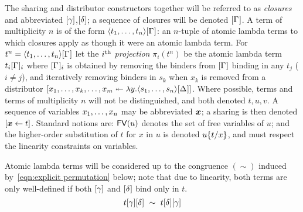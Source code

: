 \documentclass{llncs} %
\newif\ifnonotes\nonotesfalse
\newcommand{\EMPTY}[1]{\ifnonotes\else{\color{red}    \noindent #1}\fi}
\begin{document}
The sharing and distributor constructors together will be referred to as \emph{closures} and abbreviated $\g$,$\g*$;
%
a sequence of closures will be denoted $\G$.
%
A term of multiplicity $n$ is of the form $\tup t\G$: an $n$-tuple of atomic lambda terms to which closures apply as though it were an atomic lambda term.
%
%
For $t^n=\tup t\G$ let the \emph{$i^{\mbox{\scriptsize th}}$ projection} $\pi_i(t^n)$ be the atomic lambda term $t_i\G_i$ where $\G_i$ is obtained by removing the binders from $\G$ binding in any $t_j$ ($i\neq j$), and iteratively removing binders in $s_k$ when $x_k$ is removed from a distributor $\distr*{x_1,\dots,x_k,\dots,x_m}y{\tup s\G*}$.
%
%
%
Where possible, terms and terms of multiplicity $n$ will not be distinguished, and both denoted $t,u,v$.
%
A sequence of variables $\vv x$ may be abbreviated $\vv*x$; a sharing is then denoted $\share*{\vv*x}t$.
%
Standard notions are: $\FV(u)$ denotes the set of free variables of $u$; and the higher-order substitution of $t$ for $x$ in $u$ is denoted $u\sub xt$, and must respect the linearity constraints on variables.
%


Atomic lambda terms will be considered up to the congruence $(\sim)$ induced by~\eqref{eqn:explicit permutation} below;
note that due to linearity, both terms are only well-defined if both $\g$ and $\g*$ bind only in $t$.
%
\begin{equation}\label{eqn:explicit permutation}
	t\g\g* ~\sim~ t\g*\g
\end{equation}
\end{document}

